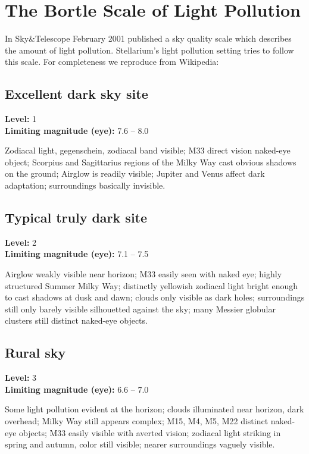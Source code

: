 
\chapter{The Bortle Scale of Light Pollution}
\label{ch:BortleScale}

In Sky\&Telescope February 2001  published a sky
quality scale which describes the amount of light
pollution. Stellarium's light pollution setting tries to follow this
scale. For completeness we reproduce from Wikipedia: 


\section{Excellent dark sky site}
\textbf{Level:} 1 \\
\textbf{Limiting magnitude (eye):} 7.6 -- 8.0

Zodiacal light, gegenschein, zodiacal band visible; M33 direct vision
naked-eye object; Scorpius and Sagittarius regions of the Milky Way
cast obvious shadows on the ground; Airglow is readily visible;
Jupiter and Venus affect dark adaptation; surroundings basically
invisible.

\section{Typical truly dark site}
\textbf{Level:} 2 \\
\textbf{Limiting magnitude (eye):} 7.1 -- 7.5

Airglow weakly visible near horizon; M33 easily seen with naked eye;
highly structured Summer Milky Way; distinctly yellowish zodiacal
light bright enough to cast shadows at dusk and dawn; clouds only
visible as dark holes; surroundings still only barely visible
silhouetted against the sky; many Messier globular clusters still
distinct naked-eye objects.

\section{Rural sky}
\textbf{Level:} 3 \\
\textbf{Limiting magnitude (eye):} 6.6 -- 7.0

Some light pollution evident at the horizon; clouds illuminated near
horizon, dark overhead; Milky Way still appears complex; M15, M4, M5,
M22 distinct naked-eye objects; M33 easily visible with averted
vision; zodiacal light striking in spring and autumn, color still
visible; nearer surroundings vaguely visible.


